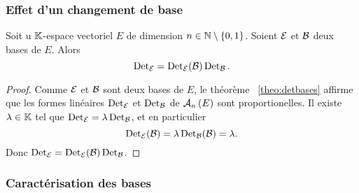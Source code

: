 \subsubsection{Effet d'un changement de base}

\begin{prop}
  Soit u \(\K\)-espace vectoriel \(E\) de dimension \(n \in 
  \N\setminus\{0,1\}\). Soient \(\E\) et \(\B\) deux bases de \(E\). Alors
  \begin{equation}
    \Det_\E = \Det_\E(\B) \Det_\B.
  \end{equation}
\end{prop}
\begin{proof}
  Comme \(\E\) et \(\B\) sont deux bases de \(E\), le théorème~
  \ref{theo:detbases} affirme que les formes linéaires \(\Det_\E\) et 
  \(\Det_\B\) de \(\AN{n}{E}\) sont proportionelles. Il existe \(\lambda \in 
  \K\) tel que \(\Det_\E = \lambda \Det_\B\), et en particulier
  \begin{equation}
    \Det_\E(\B)= \lambda \Det_\B(\B) = \lambda.
  \end{equation}
  Donc \(\Det_\E = \Det_\E(\B) \Det_\B\).
\end{proof}

\subsubsection{Caractérisation des bases}


